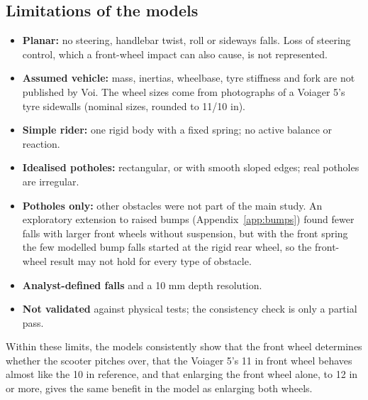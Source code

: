 \subsection{Limitations of the models}\label{limitations-of-the-models}

\begin{itemize}
\tightlist
\item
  \textbf{Planar:} no steering, handlebar twist, roll or sideways falls. Loss of steering
  control, which a front-wheel impact can also cause, is not represented.
\item
  \textbf{Assumed vehicle:} mass, inertias, wheelbase, tyre stiffness and fork are not
  published by Voi. The wheel sizes come from photographs of a Voiager 5's tyre
  sidewalls (nominal sizes, rounded to 11/10 in).
\item
  \textbf{Simple rider:} one rigid body with a fixed spring; no active balance or reaction.
\item
  \textbf{Idealised potholes:} rectangular, or with smooth sloped edges; real potholes are
  irregular.
\item
  \textbf{Potholes only:} other obstacles were not part of the main study. An exploratory
  extension to raised bumps (Appendix~\ref{app:bumps}) found fewer falls with larger
  front wheels without suspension, but with the front spring the few modelled bump falls
  started at the rigid rear wheel, so the front-wheel result may not hold for every type of
  obstacle.
\item
  \textbf{Analyst-defined falls} and a 10 mm depth resolution.
\item
  \textbf{Not validated} against physical tests; the consistency check is only a partial pass.
\end{itemize}

Within these limits, the models consistently show that the front wheel determines whether
the scooter pitches over, that the Voiager 5's 11 in front wheel behaves almost like the
10 in reference, and that enlarging the front wheel alone, to 12 in or more, gives the same
benefit in the model as enlarging both wheels.

